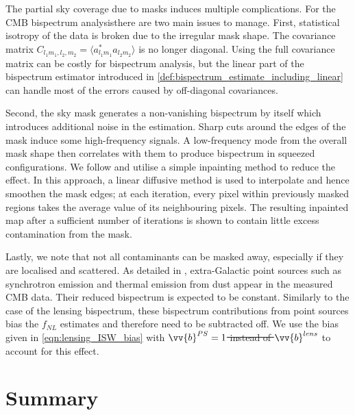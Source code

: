 \documentclass[a4paper,12pt,times,custombib,print,index]{Classes/PhDThesisPSnPDF} %
\providecommand{\DIFadd}[1]{{\protect\color{blue}\uwave{#1}}} %
\providecommand{\DIFdel}[1]{{\protect\color{red}\sout{#1}}}                      %
\providecommand{\DIFaddbegin}{} %
\providecommand{\DIFaddend}{} %
\providecommand{\DIFdelbegin}{} %
\providecommand{\DIFdelend}{} %
\newcommand{\DIFscaledelfig}{0.5}
\newlength{\DIFdelgraphicswidth} %
\newlength{\DIFdelgraphicsheight} %
\newcommand{\DIFaddincludegraphics}[2][]{{\color{blue}\fbox{\DIFOincludegraphics[#1]{#2}}}} %
\newcommand{\DIFdelincludegraphics}[2][]{%
\sbox{\DIFdelgraphicsbox}{\DIFOincludegraphics[#1]{#2}}%
\settoboxwidth{\DIFdelgraphicswidth}{\DIFdelgraphicsbox} %
\settoboxtotalheight{\DIFdelgraphicsheight}{\DIFdelgraphicsbox} %
\scalebox{\DIFscaledelfig}{%
\parbox[b]{\DIFdelgraphicswidth}{\usebox{\DIFdelgraphicsbox}\\[-\baselineskip] \rule{\DIFdelgraphicswidth}{0em}}\llap{\resizebox{\DIFdelgraphicswidth}{\DIFdelgraphicsheight}{%
\setlength{\unitlength}{\DIFdelgraphicswidth}%
\begin{picture}(1,1)%
\thicklines\linethickness{2pt} %
{\color[rgb]{1,0,0}\put(0,0){\framebox(1,1){}}}%
{\color[rgb]{1,0,0}\put(0,0){\line( 1,1){1}}}%
{\color[rgb]{1,0,0}\put(0,1){\line(1,-1){1}}}%
\end{picture}%
}\hspace*{3pt}}} %
} %
\DeclareRobustCommand{\DIFaddbegin}{\DIFOaddbegin \let\includegraphics\DIFaddincludegraphics} %
\DeclareRobustCommand{\DIFaddend}{\DIFOaddend \let\includegraphics\DIFOincludegraphics} %
\DeclareRobustCommand{\DIFdelbegin}{\DIFOdelbegin \let\includegraphics\DIFdelincludegraphics} %
\DeclareRobustCommand{\DIFdelend}{\DIFOaddend \let\includegraphics\DIFOincludegraphics} %
\begin{document}
The partial sky coverage due to masks induces multiple complications. For the CMB bispectrum analysis\DIFaddbegin \DIFadd{, }\DIFaddend there are two main issues to manage. First, \DIFaddbegin \DIFadd{the }\DIFaddend statistical isotropy of the data is broken due to the irregular mask shape. The covariance matrix $C_{l_1 m_1, l_2, m_2} = \langle a^*_{l_1 m_1} a_{l_2 m_2} \rangle$ is no longer diagonal. Using the full covariance matrix can be costly for bispectrum analysis, but the linear part of the bispectrum estimator introduced in \eqref{def:bispectrum_estimate_including_linear} can handle most of the errors caused by off-diagonal covariances.

Second, the sky mask generates a non-vanishing bispectrum by itself which introduces additional noise in the estimation. Sharp cuts around the edges of the mask induce some high-frequency signals. A low-frequency mode from the overall mask shape then correlates with them to produce bispectrum in squeezed configurations. We follow \cite{Gruetjen2017inpainting} and utilise a simple inpainting method to reduce the effect. In this approach, a linear diffusive method is used to interpolate and hence smoothen the mask edges; at each iteration, every pixel within previously masked regions takes the average value of its neighbouring pixels. The resulting inpainted map after a sufficient number of iterations is shown to contain little excess contamination from the mask. 

Lastly, we note that not all contaminants can be masked away, especially if they are localised and scattered. As detailed in \cite{PlanckCollaboration2013}, extra-Galactic point sources such as synchrotron emission and thermal emission from dust appear in the measured CMB data. Their reduced bispectrum is expected to be constant. Similarly to the case of the lensing bispectrum, these bispectrum contributions from point sources bias the \DIFdelbegin \DIFdel{$f_{NL}$ }\DIFdelend \DIFaddbegin \DIFadd{$f_\text{NL}$ }\DIFaddend estimates and therefore need to be subtracted off. We use the bias given in \eqref{eqn:lensing_ISW_bias} with \DIFdelbegin \DIFdel{$\vv{b}^{PS}=1$ instead of $\vv{b}^{lens}$ }\DIFdelend \DIFaddbegin \DIFadd{$\vv{b}^\text{PS}=1$ instead of $\vv{b}^\text{lens}$ }\DIFaddend to account for this effect.

\newpage
\section*{Summary}
\end{document}
